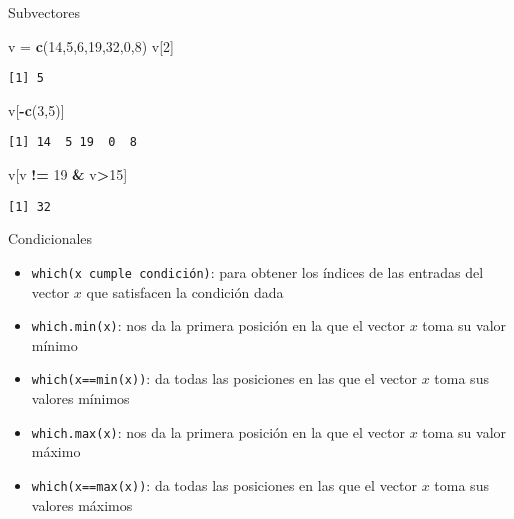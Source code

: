 \documentclass[
  ignorenonframetext,
]{beamer}
\newenvironment{Shaded}{\begin{snugshade}}{\end{snugshade}}
\newcommand{\DecValTok}[1]{\textcolor[rgb]{0.00,0.00,0.81}{#1}}
\newcommand{\KeywordTok}[1]{\textcolor[rgb]{0.13,0.29,0.53}{\textbf{#1}}}
\newcommand{\NormalTok}[1]{#1}
\newcommand{\OperatorTok}[1]{\textcolor[rgb]{0.81,0.36,0.00}{\textbf{#1}}}
\newcommand{\StringTok}[1]{\textcolor[rgb]{0.31,0.60,0.02}{#1}}
\providecommand{\tightlist}{%
  \setlength{\itemsep}{0pt}\setlength{\parskip}{0pt}}
\begin{document}
\begin{frame}[fragile]{Subvectores}
\protect\hypertarget{subvectores-2}{}

\begin{Shaded}
\begin{Highlighting}[]
\NormalTok{v =}\StringTok{ }\KeywordTok{c}\NormalTok{(}\DecValTok{14}\NormalTok{,}\DecValTok{5}\NormalTok{,}\DecValTok{6}\NormalTok{,}\DecValTok{19}\NormalTok{,}\DecValTok{32}\NormalTok{,}\DecValTok{0}\NormalTok{,}\DecValTok{8}\NormalTok{)}
\NormalTok{v[}\DecValTok{2}\NormalTok{]}
\end{Highlighting}
\end{Shaded}

\begin{verbatim}
[1] 5
\end{verbatim}

\begin{Shaded}
\begin{Highlighting}[]
\NormalTok{v[}\OperatorTok{-}\KeywordTok{c}\NormalTok{(}\DecValTok{3}\NormalTok{,}\DecValTok{5}\NormalTok{)]}
\end{Highlighting}
\end{Shaded}

\begin{verbatim}
[1] 14  5 19  0  8
\end{verbatim}

\begin{Shaded}
\begin{Highlighting}[]
\NormalTok{v[v }\OperatorTok{!=}\StringTok{ }\DecValTok{19} \OperatorTok{&}\StringTok{ }\NormalTok{v}\OperatorTok{>}\DecValTok{15}\NormalTok{]}
\end{Highlighting}
\end{Shaded}

\begin{verbatim}
[1] 32
\end{verbatim}

\end{frame}

\begin{frame}[fragile]{Condicionales}
\protect\hypertarget{condicionales}{}

\begin{itemize}
\tightlist
\item
  \texttt{which(x\ cumple\ condición)}: para obtener los índices de las
  entradas del vector \(x\) que satisfacen la condición dada
\item
  \texttt{which.min(x)}: nos da la primera posición en la que el vector
  \(x\) toma su valor mínimo
\item
  \texttt{which(x==min(x))}: da todas las posiciones en las que el
  vector \(x\) toma sus valores mínimos
\item
  \texttt{which.max(x)}: nos da la primera posición en la que el vector
  \(x\) toma su valor máximo
\item
  \texttt{which(x==max(x))}: da todas las posiciones en las que el
  vector \(x\) toma sus valores máximos
\end{itemize}

\end{frame}
\end{document}
